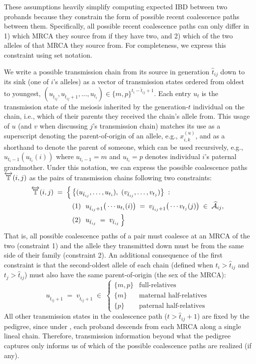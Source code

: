 \documentclass[12pt]{article}
\numberwithin{equation}{section}
\begin{document}
These assumptions heavily simplify computing expected IBD between two probands because they constrain the form of possible recent coalescence paths between them.
Specifically, all possible recent coalescence paths can only differ in 1) which MRCA they source from if they have two, and 2) which of the two alleles of that MRCA they source from.
For completeness, we express this constraint using set notation.

We write a possible transmission chain from its source in generation $\hat{t}_{ij}$ down to its sink (one of $i$'s alleles) as a vector of transmission states ordered from oldest to youngest, $(u_{\hat{t}_{ij}}, u_{\hat{t}_{ij}+1}, \dots, u_{t_i}) \in \{m,p\}^{t_i - \hat{t}_{ij} + 1}$.
Each entry $u_t$ is the transmission state of the meiosis inherited by the generation-$t$ individual on the chain, i.e., which of their parents they received the chain's allele from.
This usage of $u$ (and $v$ when discussing $j$'s transmission chain) matches its use as a superscript denoting the parent-of-origin of an allele, e.g., $x^{(u)}_{i,k}$, and as a shorthand to denote the parent of someone, which can be used recursively, e.g., $u_{t_i - 1}(u_{t_i}(i))$ where $u_{t_i - 1} = m$ and $u_{t_i} = p$ denotes individual $i$'s paternal grandmother.
Under this notation, we can express the possible coalescence paths $\overleftrightarrow{\mathbb{T}}(i,j)$ as the pairs of transmission chains following two constraints:
\begin{equation}\label{eq:well-behaved-cpaths}
\begin{aligned}
    \overleftrightarrow{\mathbb{T}}(i,j) \;=\; \Big\{\, & \big\{ (u_{\hat{t}_{ij}}, \dots, u_{t_i}),\ (v_{\hat{t}_{ij}}, \dots, v_{t_j}) \big\} \;: \\
    & \text{(1)}\ \ u_{\hat{t}_{ij}+1}\big(\cdots u_{t_i}(i)\big) \;=\; v_{\hat{t}_{ij}+1}\big(\cdots v_{t_j}(j)\big) \;\in\; \widehat{\mathcal{A}}_{ij}, \\
    & \text{(2)}\ \ u_{\hat{t}_{ij}} \;=\; v_{\hat{t}_{ij}} \,\Big\}
\end{aligned}
\end{equation}
That is, all possible coalescence paths of a pair must coalesce at an MRCA of the two (constraint 1) and the allele they transmitted down must be from the same side of their family (constraint 2).
An additional consequence of the first constraint is that the second-oldest allele of each chain (defined when $t_i > \hat{t}_{ij}$ and $t_j > \hat{t}_{ij}$) must also have the same parent-of-origin (the sex of the MRCA):
$$
    u_{\hat{t}_{ij}+1} \;=\; v_{\hat{t}_{ij}+1} \;\in\;
    \begin{cases}
        \{m, p\} & \text{full-relatives} \\
        \{m\} & \text{maternal half-relatives} \\
        \{p\} & \text{paternal half-relatives}
    \end{cases}
$$
All other transmission states in the coalescence path ($t > \hat{t}_{ij} + 1$) are fixed by the pedigree, since under , each proband descends from each MRCA along a single lineal chain.
Therefore, transmission information beyond what the pedigree captures only informs us of which of the possible coalescence paths are realized (if any).
\end{document}

